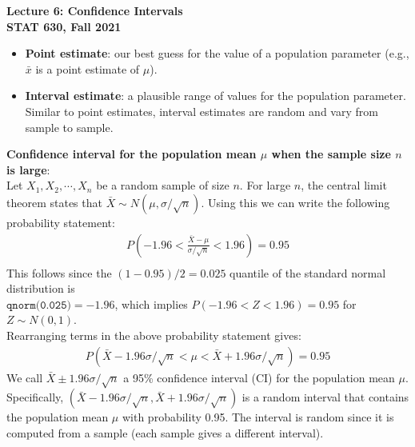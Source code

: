 \documentclass[fleqn, 11pt]{article}\usepackage[]{graphicx}\usepackage[]{color}
\begin{document}
\setlength\parindent{0pt}

\begin{center}
\large
\textbf{Lecture 6: Confidence Intervals}\\
\normalsize
\textbf{STAT 630, Fall 2021}\\
\hrulefill
\end{center}

\begin{itemize}
\item \textbf{Point estimate}: our best guess for the value of a population parameter (e.g., $\bar{x}$ is a point estimate of $\mu$).
\item \textbf{Interval estimate}: a plausible range of values for the population parameter.  Similar to point estimates, interval estimates are random and vary from sample to sample.\\    
\end{itemize}

\textbf{Confidence interval for the population mean $\mu$ when the sample size $n$ is large}:\\

Let $X_1, X_2, \cdots, X_n$ be a random sample of size $n$.  For large $n$, the central limit theorem states that $\bar{X} \sim N(\mu, \sigma / \sqrt{n})$.  Using this we can write the following probability statement:
\begin{align*}
P \left( -1.96 < \frac{\bar{X} - \mu}{\sigma / \sqrt{n}} < 1.96 \right) = 0.95\\
\end{align*}
This follows since the $(1-0.95)/2 = 0.025$ quantile of the standard normal distribution is\\ $\texttt{qnorm(0.025)}=-1.96$, which implies $P(-1.96 < Z < 1.96) = 0.95$ for $Z\sim N(0,1)$.\\  Rearranging terms in the above probability statement gives:
\begin{align*}
P(\bar{X} - 1.96 \sigma / \sqrt{n} < \mu < \bar{X} + 1.96 \sigma / \sqrt{n}) = 0.95
\end{align*}
We call $\bar{X} \pm 1.96 \sigma / \sqrt{n}$ a 95\% confidence interval (CI) for the population mean $\mu$.  Specifically, $(\bar{X} - 1.96 \sigma / \sqrt{n}, \bar{X} + 1.96 \sigma / \sqrt{n})$ is a random interval that contains the population mean $\mu$ with probability 0.95.  The interval is random since it is computed from a sample (each sample gives a different interval).\\ 
\end{document}

